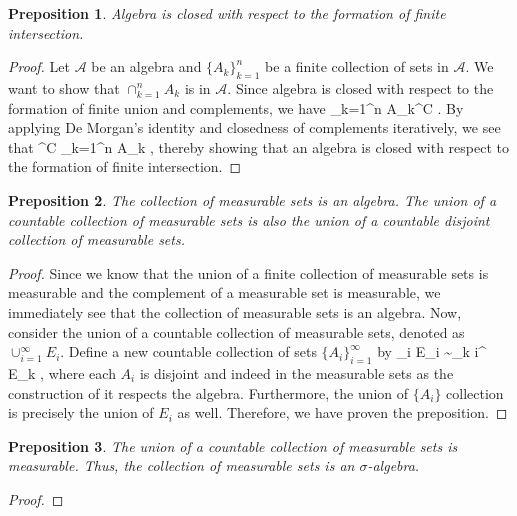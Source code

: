 \documentclass{article} %
\def\eQb#1\eQe{\begin{eqnarray*}#1\end{eqnarray*}}
\theoremstyle{quest}
\newtheorem*{preposition}{Preposition}
\begin{document}
\bigskip

\begin{preposition}
Algebra is closed with respect to the formation of finite intersection.
\end{preposition}
\begin{proof}
Let $\mathcal{A}$ be an algebra and $\{ A_k \}_{k=1}^{n}$ be a finite collection of
sets in $\mathcal{A}$. We want to show that $\cap_{k=1}^{n} A_k$ is in $\mathcal{A}$.
Since algebra is closed with respect to the formation of finite union
and complements, we have 
\eQb
\cup_{k=1}^{n} A_k^{C} \>  \> . 
\eQe
By applying De Morgan's identity and closedness of complements iteratively, we see that
\eQb
{(\cap_{k=1}^{n} A_k)}^{C} \>  \>  \>\>  \>\>
\cap_{k=1}^{n} A_k \>  \> , 
\eQe
thereby showing that an algebra is closed with respect to the formation of finite intersection.
\end{proof}

\bigskip

\begin{preposition}
The collection of measurable sets is an algebra. The union of a countable collection of measurable sets
is also the union of a countable disjoint collection of measurable sets. 
\end{preposition}
\begin{proof} Since we know that the union of a finite collection of measurable sets is measurable 
and the complement of a measurable set is measurable, we immediately see that the collection of
measurable sets is an algebra. Now, consider the union of a countable collection of measurable sets,
denoted as $\cup_{i=1}^{\infty}E_i$. Define a new countable collection of sets 
$\{ A_i \}_{i=1}^{\infty} $
by
\eQb
A_i \triangleq E_i \sim \cup_{k \neq i}^{\infty} E_k , 
\eQe
where each $A_i$ is disjoint and 
indeed in the measurable sets as the construction of it respects the algebra.
Furthermore, the union of $\{ A_i \}$ collection is precisely 
the union of $E_i$ as well. Therefore, we have 
proven the preposition.
\end{proof}

\bigskip

\begin{preposition}
The union of a countable collection of measurable sets is measurable. Thus,
the collection of measurable sets is an $\sigma$-algebra.
\end{preposition}
\begin{proof}
\end{proof}
\end{document}
